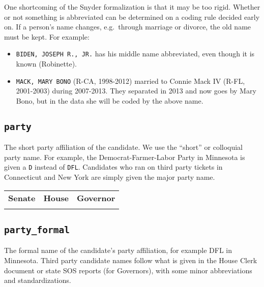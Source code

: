 \documentclass[12pt]{article}
\begin{document}
One shortcoming of the Snyder formalization is that it may be
{too} rigid. Whether or not something is abbreviated can be
determined on a coding rule decided early on. If a person's name
changes, e.g.~through marriage or divorce, the old name must be kept.
For example:

\begin{itemize}
\tightlist
\item
  \texttt{BIDEN,\ JOSEPH\ R.,\ JR.} has his middle name abbreviated,
  even though it is known (Robinette).
\item
  \texttt{MACK,\ MARY\ BONO} (R-CA, 1998-2012) married to Connie Mack IV
  (R-FL, 2001-2003) during 2007-2013. They separated in 2013 and now
  goes by Mary Bono, but in the data she will be coded by the above
  name.
\end{itemize}


\newpage

\FloatBarrier


\subsection*{\texttt{party}} 

The short party affiliation of the candidate. We use the ``short'' or colloquial party name. For example, the Democrat-Farmer-Labor Party in Minnesota is given a \texttt{D} instead of \texttt{DFL}. Candidates who ran on third party tickets in Connecticut and New York are simply given the major party name.   
\begin{table}[!h]
\begin{adjustwidth}{-4em}{-4em}
\centering
\begin{tabularx}{\linewidth}{CCC}
\textbf{Senate} & \textbf{House} & \textbf{Governor}\\
   &  &
\end{tabularx}
\end{adjustwidth}
\end{table}


\FloatBarrier 

\subsection*{\texttt{party\_formal}}
The formal name of the candidate's party affiliation, for example DFL in Minnesota. Third party candidate names follow what is given in the House Clerk document or state SOS reports (for Governors), with some minor abbreviations and standardizations.
\end{document}
